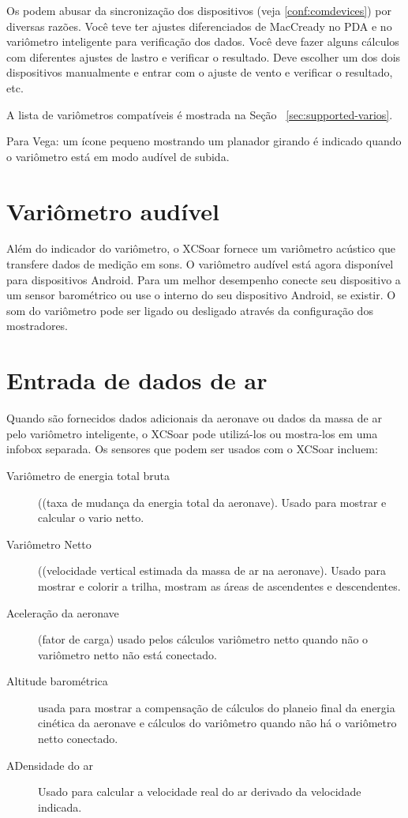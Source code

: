 Os podem abusar da sincronização dos dispositivos (veja  \ref{conf:comdevices}) por diversas razões.  Você teve ter ajustes diferenciados de MacCready no PDA e no variômetro inteligente para verificação dos dados. Você deve fazer alguns cálculos com diferentes ajustes de lastro e verificar o resultado.  Deve escolher um dos dois dispositivos manualmente e entrar com o ajuste de vento e verificar o resultado, etc.

A lista de variômetros compatíveis é mostrada na Seção ~\ref{sec:supported-varios}.

Para Vega: um ícone pequeno mostrando um planador girando é indicado quando o variômetro está em modo audível de subida.

\section{Variômetro audível}

Além do indicador do variômetro, o XCSoar fornece um variômetro acústico que transfere dados de medição em sons.  O variômetro audível está agora disponível para dispositivos Android.  Para um melhor desempenho conecte seu dispositivo a um sensor barométrico ou use o interno do seu dispositivo Android, se existir.  O som do variômetro pode ser ligado ou desligado através da configuração dos mostradores.


\section{Entrada de dados de ar}

Quando são fornecidos dados adicionais da aeronave ou dados da massa de ar pelo variômetro inteligente, o XCSoar pode utilizá-los ou mostra-los em uma infobox separada.  Os sensores que podem ser usados com o XCSoar incluem:
\begin{description}
\item[Variômetro de energia total bruta] ((taxa de mudança da energia total da aeronave).  Usado para mostrar e calcular o vario netto.
\item[Variômetro Netto] ((velocidade vertical estimada da massa de ar na aeronave).   Usado para mostrar e colorir a trilha, mostram as áreas de ascendentes e descendentes.
\item[Aceleração da aeronave] (fator de carga) usado pelos cálculos variômetro netto quando não o variômetro netto não está conectado. 
\item[Altitude barométrica] usada para mostrar a compensação de cálculos do planeio final da energia cinética da aeronave e cálculos do variômetro quando não há o variômetro netto conectado.
\item[ADensidade do ar] Usado para calcular a velocidade real do ar derivado da velocidade indicada.
\end{description}


